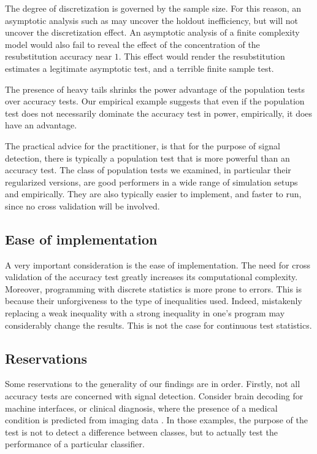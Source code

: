 \documentclass[12pt,a4paper]{article}
\theoremstyle{definition}
\begin{document}
The degree of discretization is governed by the sample size. 
For this reason, an asymptotic analysis such as \cite{ramdas_classification_2016} may uncover the holdout inefficiency, but will not uncover the discretization effect. 
An asymptotic analysis of a finite complexity model would also fail to reveal the effect of the concentration of the resubstitution accuracy near $1$. This effect would render the resubstitution estimates a legitimate asymptotic test, and a terrible finite sample test. 

The presence of heavy tails shrinks the power advantage of the population tests over accuracy tests. 
Our empirical example suggests that even if the population test does not necessarily dominate the accuracy test in power, empirically, it does have an advantage. 


The practical advice for the practitioner, is that for the purpose of signal detection, there is typically a population test that is more powerful than an accuracy test. 
The class of population tests we examined, in particular their regularized versions, are good performers in a wide range of simulation setups and empirically. 
They are also typically easier to implement, and faster to run, since no cross validation will be involved. 



\subsection{Ease of implementation}
A very important consideration is the ease of implementation. 
The need for cross validation of the accuracy test greatly increases its computational complexity. 
Moreover, programming with discrete statistics is more prone to errors. 
This is because their unforgiveness to the type of inequalities used. 
Indeed, mistakenly replacing a weak inequality with a strong inequality in one's program may considerably change the results. 
This is not the case for continuous test statistics. 




\subsection{Reservations}
\label{sec:reservations}

Some reservations to the generality of our findings are in order. 
Firstly, not all accuracy tests are concerned with signal detection.
Consider brain decoding for machine interfaces, or clinical diagnosis, where the presence of a medical condition is predicted from imaging data \citep[e.g.][]{olivetti_induction_2012,wager_fmri-based_2013}. 
In those examples, the purpose of the test is not to detect a difference between classes, but to actually test the performance of a particular classifier.  
\end{document}
